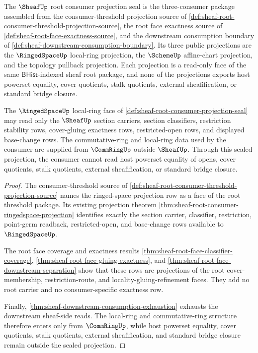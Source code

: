 \begin{definition}
\label{def:sheaf-root-consumer-projection-seal}
The $\SheafUp$ root consumer projection seal is the three-consumer package assembled from the consumer-threshold projection source of \autoref{def:sheaf-root-consumer-threshold-projection-source}, the root face exactness source of \autoref{def:sheaf-root-face-exactness-source}, and the downstream consumption boundary of \autoref{def:sheaf-downstream-consumption-boundary}. Its three public projections are the $\RingedSpaceUp$ local-ring projection, the $\SchemeUp$ affine-chart projection, and the topology pullback projection. Each projection is a read-only face of the same $\mathsf{BHist}$-indexed sheaf root package, and none of the projections exports host powerset equality, cover quotients, stalk quotients, external sheafification, or standard bridge closure.
\end{definition}

\begin{theorem}
\label{thm:sheaf-root-ringedspace-local-ring-projection-seal}
The $\RingedSpaceUp$ local-ring face of \autoref{def:sheaf-root-consumer-projection-seal} may read only the $\SheafUp$ section carriers, section classifiers, restriction stability rows, cover-gluing exactness rows, restricted-open rows, and displayed base-change rows. The commutative-ring and local-ring data used by the consumer are supplied from $\CommRingUp$ outside $\SheafUp$. Through this sealed projection, the consumer cannot read host powerset equality of opens, cover quotients, stalk quotients, external sheafification, or standard bridge closure.
\end{theorem}
\begin{proof}
The consumer-threshold source of \autoref{def:sheaf-root-consumer-threshold-projection-source} names the ringed-space projection row as a face of the root threshold package. Its existing projection theorem \autoref{thm:sheaf-root-consumer-ringedspace-projection} identifies exactly the section carrier, classifier, restriction, point-germ readback, restricted-open, and base-change rows available to $\RingedSpaceUp$.

The root face coverage and exactness results \autoref{thm:sheaf-root-face-classifier-coverage}, \autoref{thm:sheaf-root-face-gluing-exactness}, and \autoref{thm:sheaf-root-face-downstream-separation} show that these rows are projections of the root cover-membership, restriction-route, and locality-gluing-refinement faces. They add no root carrier and no consumer-specific exactness row.

Finally, \autoref{thm:sheaf-downstream-consumption-exhaustion} exhausts the downstream sheaf-side reads. The local-ring and commutative-ring structure therefore enters only from $\CommRingUp$, while host powerset equality, cover quotients, stalk quotients, external sheafification, and standard bridge closure remain outside the sealed projection.
\end{proof}

